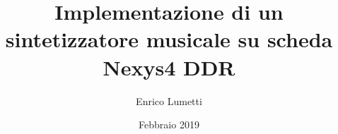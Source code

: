 \documentclass[a4paper,12pt]{book}
\begin{document}
\author{Enrico Lumetti}
\title{Implementazione di un sintetizzatore musicale su scheda Nexys4 DDR}
\date{Febbraio 2019}

\frontmatter
\maketitle
\tableofcontents

\mainmatter






\backmatter
\end{document}
